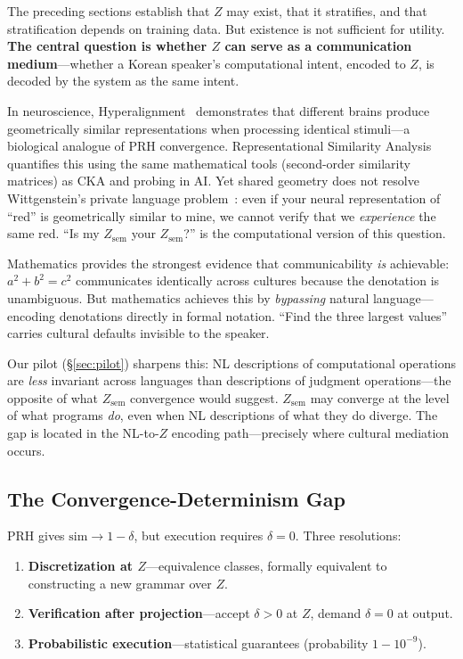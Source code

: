 \documentclass[11pt]{article}
\theoremstyle{definition}
\newcommand{\Zsem}{Z_{\text{sem}}}
\begin{document}
The preceding sections establish that $Z$ may exist, that it stratifies, and that stratification depends on training data. But existence is not sufficient for utility. \textbf{The central question is whether $Z$ can serve as a communication medium}---whether a Korean speaker's computational intent, encoded to $Z$, is decoded by the system as the same intent.

In neuroscience, Hyperalignment~\cite{haxby2011hyperalignment} demonstrates that different brains produce geometrically similar representations when processing identical stimuli---a biological analogue of PRH convergence. Representational Similarity Analysis~\cite{kriegeskorte2008rsa} quantifies this using the same mathematical tools (second-order similarity matrices) as CKA and probing in AI. Yet shared geometry does not resolve Wittgenstein's private language problem~\cite{wittgenstein1953}: even if your neural representation of ``red'' is geometrically similar to mine, we cannot verify that we \emph{experience} the same red. ``Is my $\Zsem$ your $\Zsem$?'' is the computational version of this question.

Mathematics provides the strongest evidence that communicability \emph{is} achievable: $a^2 + b^2 = c^2$ communicates identically across cultures because the denotation is unambiguous. But mathematics achieves this by \emph{bypassing} natural language---encoding denotations directly in formal notation. ``Find the three largest values'' carries cultural defaults invisible to the speaker.

Our pilot (\S\ref{sec:pilot}) sharpens this: NL descriptions of computational operations are \emph{less} invariant across languages than descriptions of judgment operations---the opposite of what $\Zsem$ convergence would suggest. $\Zsem$ may converge at the level of what programs \emph{do}, even when NL descriptions of what they do diverge. The gap is located in the NL-to-$Z$ encoding path---precisely where cultural mediation occurs.

\subsection{The Convergence-Determinism Gap}

PRH gives $\mathrm{sim} \to 1 - \delta$, but execution requires $\delta = 0$. Three resolutions:
\begin{enumerate}[nosep]
  \item \textbf{Discretization at $Z$}---equivalence classes, formally equivalent to constructing a new grammar over $Z$.
  \item \textbf{Verification after projection}---accept $\delta > 0$ at $Z$, demand $\delta = 0$ at output.
  \item \textbf{Probabilistic execution}---statistical guarantees (probability $1 - 10^{-9}$).
\end{enumerate}
\end{document}
